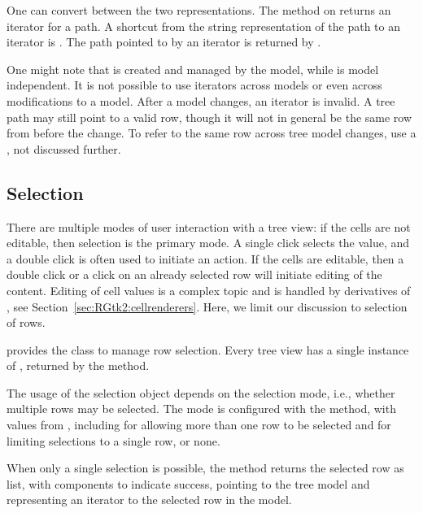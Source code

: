One can convert between the two representations. The method
 on  returns an
iterator for a path. A shortcut from the string representation of the
path to an iterator is . The
path pointed to by an iterator is returned by
.

One might note that  is created and managed by the
model, while  is model independent. It is not
possible to use iterators across models or even across modifications
to a model. After a model changes, an iterator is invalid. A tree path
may still point to a valid row, though it will not in general be the
same row from before the change. To refer to the same row across tree
model changes, use a , not discussed
further.

\subsection{Selection}

There are multiple modes of user interaction with a tree view: if the
cells are not editable, then selection is the primary mode.  A single
click selects the value, and a double click is often used to initiate
an action. If the cells are editable, then a double click or a click
on an already selected row will initiate editing of the
content. Editing of cell values is a complex topic and is handled by
derivatives of , see
Section~\ref{sec:RGtk2:cellrenderers}. Here, we limit our discussion
to selection of rows.

\GTK\/ provides the class  to manage row
selection. Every tree view has a single instance of
, returned by the
 method.

The usage of the selection object depends on the selection mode, i.e.,
whether multiple rows may be selected. The mode is configured with the
 method, with values from
, including  for allowing more
than one row to be selected and  for limiting selections
to a single row, or none.

When only a single selection is possible, the method
 returns the selected row as
list, with components  to indicate success, 
pointing to the tree model and  representing an iterator to
the selected row in the model.

